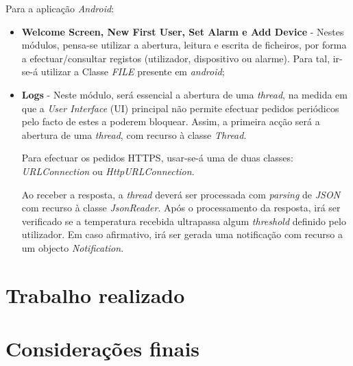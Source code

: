 \documentclass[a4paper]{article}
\begin{document}
Para a aplicação \textit{Android}:
\begin{itemize}
\item \textbf{Welcome Screen, New First User, Set Alarm e Add Device} - Nestes módulos, pensa-se utilizar a abertura, leitura e escrita de ficheiros, por forma a efectuar/consultar registos (utilizador, dispositivo ou alarme). Para tal, ir-se-á utilizar a Classe \textit{FILE} presente em \textit{android};

\item \textbf{Logs} - Neste módulo, será essencial a abertura de uma \textit{thread}, na medida em que a \textit{User Interface} (UI) principal não permite efectuar pedidos periódicos pelo facto de estes a poderem bloquear. Assim, a primeira acção será a abertura de uma \textit{thread}, com recurso à classe \textit{Thread}. 

Para efectuar os pedidos HTTPS, usar-se-á uma de duas classes: \textit{URLConnection} ou \textit{HttpURLConnection}.

Ao receber a resposta, a \textit{thread} deverá ser processada com \textit{parsing} de \textit{JSON} com recurso à classe \textit{JsonReader}. Após o processamento da resposta, irá ser verificado se a temperatura recebida ultrapassa algum \textit{threshold} definido pelo utilizador. Em caso afirmativo, irá ser gerada uma notificação com recurso a um objecto \textit{Notification}.
\end{itemize}

\section{Trabalho realizado}
\section{Considerações finais}
\end{document}
